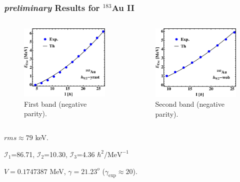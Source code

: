\documentclass{beamer}
\begin{document}
\begin{frame}
    \frametitle{{\tiny \emph{preliminary}} Results for $^{183}$Au II}
    \begin{columns}[c] 
     \begin{figure}
         \centering
         \includegraphics[scale=0.4]{figs/Au_183_plot1Negative.pdf}
         \caption{First band (negative parity).}
     \end{figure}
     \begin{figure}
         \centering
         \includegraphics[scale=0.4]{figs/Au_183_plot2Negative.pdf}
         \caption{Second band (negative parity).}
     \end{figure}
    \end{columns}
    \par $rms\approx79$ keV.
    \par $\mathcal{I}_1$=86.71, $\mathcal{I}_2$=10.30, $\mathcal{I}_3$=4.36 $\hbar^2/\text{MeV}^{-1}$
    \par $V=0.1747387$ MeV, $\gamma=21.23^o$ ($\gamma_\text{exp}\approx 20$).
\end{frame}
\end{document}
